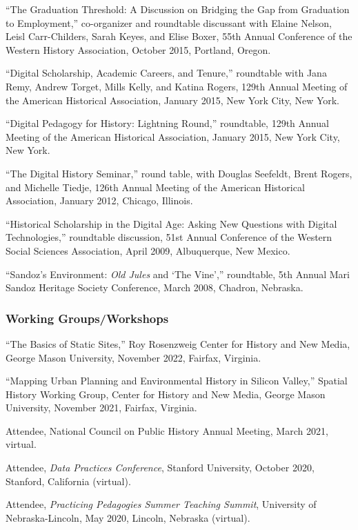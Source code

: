 ``The Graduation Threshold: A Discussion on Bridging the Gap from
Graduation to Employment,'' co-organizer and roundtable discussant with
Elaine Nelson, Leisl Carr-Childers, Sarah Keyes, and Elise Boxer, 55th
Annual Conference of the Western History Association, October 2015,
Portland, Oregon.

``Digital Scholarship, Academic Careers, and Tenure,'' roundtable with
Jana Remy, Andrew Torget, Mills Kelly, and Katina Rogers, 129th Annual
Meeting of the American Historical Association, January 2015, New York
City, New York.

``Digital Pedagogy for History: Lightning Round,'' roundtable, 129th
Annual Meeting of the American Historical Association, January 2015, New
York City, New York.

``The Digital History Seminar,'' round table, with Douglas Seefeldt,
Brent Rogers, and Michelle Tiedje, 126th Annual Meeting of the American
Historical Association, January 2012, Chicago, Illinois.

``Historical Scholarship in the Digital Age: Asking New Questions with
Digital Technologies,'' roundtable discussion, 51st Annual Conference of
the Western Social Sciences Association, April 2009, Albuquerque, New
Mexico.

``Sandoz's Environment: \emph{Old Jules} and `The Vine','' roundtable,
5th Annual Mari Sandoz Heritage Society Conference, March 2008, Chadron,
Nebraska.

\hypertarget{working-groupsworkshops}{%
\subsubsection{Working Groups/Workshops}\label{working-groupsworkshops}}

``The Basics of Static Sites,'' Roy Rosenzweig Center for History and
New Media, George Mason University, November 2022, Fairfax, Virginia.

``Mapping Urban Planning and Environmental History in Silicon Valley,''
Spatial History Working Group, Center for History and New Media, George
Mason University, November 2021, Fairfax, Virginia.

Attendee, National Council on Public History Annual Meeting, March 2021,
virtual.

Attendee, \emph{Data Practices Conference}, Stanford University, October
2020, Stanford, California (virtual).

Attendee, \emph{Practicing Pedagogies Summer Teaching Summit},
University of Nebraska-Lincoln, May 2020, Lincoln, Nebraska (virtual).

